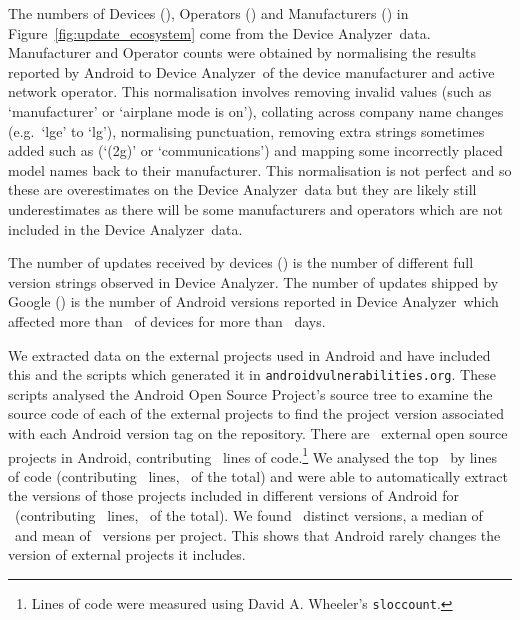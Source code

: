 \documentclass[conference,a4paper,twoside]{IEEEtran}
\let\OldTodo\todo
\renewcommand{\todo}{\OldTodo[inline]}
\newcommand{\todolater}[1]{}%
\newcommand{\da}{Device Analyzer}
\newcommand{\avo}{\texttt{androidvulnerabilities.org}}
\begin{document}
The numbers of Devices (\daNumOSDevices), Operators (\daNumOperators) and Manufacturers (\daNumManufacturers) in Figure~\ref{fig:update_ecosystem} come from the \da\ data.
Manufacturer and Operator counts were obtained by normalising the results reported by Android to \da\ of the device manufacturer and active network operator.
This normalisation involves removing invalid values (such as `manufacturer' or `airplane mode is on'), collating across company name changes (e.g.\ `lge' to `lg'), normalising punctuation, removing extra strings sometimes added such as (`(2g)' or `communications') and mapping some incorrectly placed model names back to their manufacturer.
This normalisation is not perfect and so these are overestimates on the \da\ data but they are likely still underestimates as there will be some manufacturers and operators which are not included in the \da\ data.

The number of updates received by devices (\daNumFullVersions) is the number of different full version strings observed in \da.
The number of updates shipped by Google (\daNumSigOSVersions) is the number of Android versions reported in \da\ which affected more than \daSigVersionPerc\ of devices for more than \daSigVersionDays\ days. \todolater{this is the wrong number to be using}

We extracted data on the external projects used in Android and have included this and the scripts which generated it in \avo.
These scripts analysed the Android Open Source Project's source tree to examine the source code of each of the external projects to find the project version associated with each Android version tag on the repository.
There are \avoNumExternalProjects\ external open source projects in Android, contributing \avoTotalExternalLines\ lines of code.\footnote{Lines of code were measured using David A. Wheeler's \texttt{sloccount}.}
We analysed the top \avoNumBigExternalProjects\ by lines of code (contributing \avoNumBigExternalLinesOfCode\ lines, \avoBigExternalLinesOfCodePerc\ of the total) and were able to automatically extract the versions of those projects included in different versions of Android for \avoNumAnalysedExternalProjects\ (contributing \avoNumAnalysedExternalLinesOfCode\ lines, \avoAnalysedExternalLinesOfCodePerc\ of the total).
We found \avoBigExternalTotalVersions\ distinct versions, a median of \avoBigExternalMedianVersions\ and mean of \avoBigExternalMeanVersions\ versions per project.
This shows that Android rarely changes the version of external projects it includes.
\end{document}
